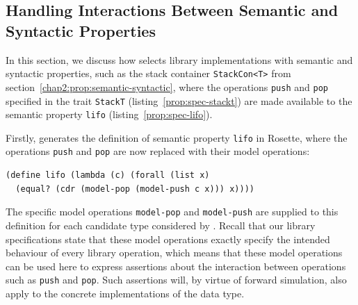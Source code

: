 \subsection{Handling Interactions Between Semantic and Syntactic Properties}
\label{chap2:select:stack}
In this section, we discuss  how \Primrose{} selects library implementations with semantic and syntactic properties, such as the stack container \lstinline{StackCon<T>} from section~\ref{chap2:prop:semantic-syntactic}, where the operations \lstinline|push| and \lstinline|pop| specified in the trait \lstinline|StackT| (listing~\ref{prop:spec-stackt}) are made available to
the semantic property \lstinline|lifo| (listing~\ref{prop:spec-lifo}).

Firstly, \Primrose{} generates the definition of semantic property \lstinline|lifo| in Rosette, where the operations \lstinline|push| and \lstinline|pop| are now replaced 
with their model operations:
\begin{lstlisting}[language=racket, style=boxed]
(define lifo (lambda (c) (forall (list x) 
  (equal? (cdr (model-pop (model-push c x))) x))))
\end{lstlisting}
The specific model operations \lstinline|model-pop| and \lstinline|model-push| are supplied to this definition for each candidate type considered by \Primrose{}.
Recall that our library specifications state that these model operations exactly specify the intended behaviour of every library operation, which means that 
these model operations can be used here to express assertions about the interaction between operations such as \lstinline|push| and \lstinline|pop|. Such assertions will, by virtue of forward simulation, also apply to the concrete implementations of the data type.

